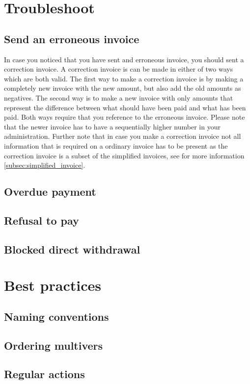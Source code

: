 \documentclass{report}
\begin{document}
\section{Troubleshoot}
\subsection{Send an erroneous invoice}
In case you noticed that you have sent and erroneous invoice, you should sent a correction invoice. A correction invoice is can be made in either of two ways which are both valid. 
The first way to make a correction invoice is by making a completely new invoice with the new amount, but also add the old amounts as negatives.
The second way is to make a new invoice with only amounts that represent the difference between what should have been paid and what has been paid. 
Both ways require that you reference to the erroneous invoice. Please note that the newer invoice has to have a sequentially higher number in your administration. Further note that in case you make a correction invoice not all information that is required on a ordinary invoice has to be present as the correction invoice is a subset of the simplified invoices, see for more information \ref{subsec:simplified_invoice}.

\subsection{Overdue payment}
\subsection{Refusal to pay}
\subsection{Blocked direct withdrawal}
\section{Best practices}
\subsection{Naming conventions}
\subsection{Ordering multivers}
\subsection{Regular actions}
\end{document}
